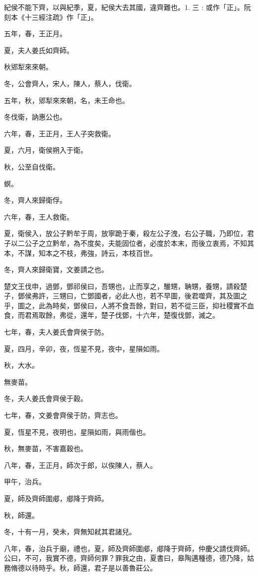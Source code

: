 \begin{pinyinscope}
紀侯不能下齊，以與紀季，夏，紀侯大去其國，違齊難也。1. 三 : 或作「正」。阮刻本《十三經注疏》作「正」。

五年，春，王正月。

夏，夫人姜氏如齊師。

秋郳犁來來朝。

冬，公會齊人，宋人，陳人，蔡人，伐衛。

五年，秋，郳犁來來朝，名，未王命也。

冬伐衛，訥惠公也。

六年，春，王正月，王人子突救衛。

夏，六月，衛侯朔入于衛。

秋，公至自伐衛。

螟。

冬，齊人來歸衛俘。

六年，春，王人救衛。

夏，衛侯入，放公子黔牟于周，放寧跪于秦，殺左公子洩，右公子職，乃即位，君子以二公子之立黔牟，為不度矣，夫能固位者，必度於本末，而後立衷焉，不知其本，不謀，知本之不枝，弗強，詩云，本枝百世。

冬，齊人來歸衛寶，文姜請之也。

楚文王伐申，過鄧，鄧祁侯曰，吾甥也，止而享之，騅甥，聃甥，養甥，請殺楚子，鄧侯弗許，三甥曰，亡鄧國者，必此人也，若不早圖，後君噬齊，其及圖之乎，圖之，此為時矣，鄧侯曰，人將不食吾餘，對曰，若不從三臣，抑社稷實不血食，而君焉取餘，弗從，還年，楚子伐鄧，十六年，楚復伐鄧，滅之。

七年，春，夫人姜氏會齊侯于防。

夏，四月，辛卯，夜，恆星不見，夜中，星隕如雨。

秋，大水。

無麥苗。

冬，夫人姜氏會齊侯于穀。

七年，春，文姜會齊侯于防，齊志也。

夏，恆星不見，夜明也，星隕如雨，與雨偕也。

秋，無麥苗，不害嘉穀也。

八年，春，王正月，師次于郎，以俟陳人，蔡人。

甲午，治兵。

夏，師及齊師圍郕，郕降于齊師。

秋，師還。

冬，十有一月，癸未，齊無知弒其君諸兒。

八年，春，治兵于廟，禮也，夏，師及齊師圍郕，郕降于齊師，仲慶父請伐齊師。公曰，不可，我實不德，齊師何罪？罪我之由，夏書曰，皋陶邁種德，德乃降，姑務脩德以待時乎。秋，師還，君子是以善魯莊公。


\end{pinyinscope}
